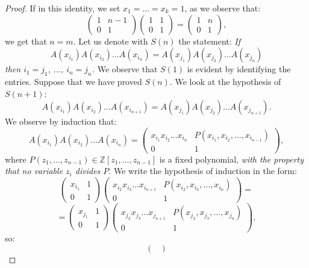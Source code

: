 \documentclass{article}
\theoremstyle{plain}
\theoremstyle{definition}
\begin{document}
\begin{proof}
    If in this identity, we set $x_1 = \dots = x_k = 1$, as we observe that:
    $$\begin{pmatrix}
        1 & n-1 \\ 0 & 1
    \end{pmatrix}
    \begin{pmatrix}
         1 & 1 \\ 0 & 1
    \end{pmatrix} = 
    \begin{pmatrix}
        1 & n \\ 0 & 1
    \end{pmatrix},$$
    we get that $n = m$. 
    Let us denote with $S(n)$ the statement: {\it If
     $$A(x_{i_1}) A(x_{i_2}) \dots A(x_{i_n}) = A(x_{j_1}) A(x_{j_2}) \dots A(x_{j_n})$$
    then $i_1 = j_1$, $\dots$, $i_n = j_n$.}
    We observe that $S(1)$ is evident by identifying the entries. Suppose that we have proved $S(n)$. We look at the hypothesis of $S(n+1)$:
    $$A(x_{i_1}) A(x_{i_2}) \dots A(x_{i_{n+1}}) = A(x_{j_1}) A(x_{j_2}) \dots A(x_{j_{n+1}}).$$
    We observe by induction that:
    $$A(x_{i_1}) A(x_{i_2}) \dots A(x_{i_n}) = 
    \begin{pmatrix}
        x_{i_1}x_{i_2} \dots x_{i_n} & P(x_{i_1}, x_{i_2}, \dots, x_{i_{n-1}}) \\ 0 & 1
    \end{pmatrix},
    $$ where $P(z_1, \dots, z_{n-1}) \in \mathbb Z[z_1, \dots, z_{n-1}]$ is a fixed polynomial, {\it with the property that no variable $z_i$ divides $P$}. We write the hypothesis of induction in the form:
    $$
    \begin{pmatrix}
        x_{i_1} & 1 \\ 0 & 1
    \end{pmatrix}
    \begin{pmatrix}
        x_{i_2}x_{i_3} \dots x_{i_{n+1}} & P(x_{i_2}, x_{i_3}, \dots, x_{i_{n}}) \\ 0 & 1
    \end{pmatrix} = $$$$ =
    \begin{pmatrix}
        x_{j_1} & 1 \\ 0 & 1
    \end{pmatrix}
    \begin{pmatrix}
        x_{j_2}x_{j_3} \dots x_{j_{n+1}} & P(x_{j_2}, x_{j_3}, \dots, x_{j_{n}}) \\ 0 & 1
    \end{pmatrix},
    $$ 
     so:
     $$
      \begin{pmatrix}

\end{pmatrix}$$
\end{proof}
\end{document}
